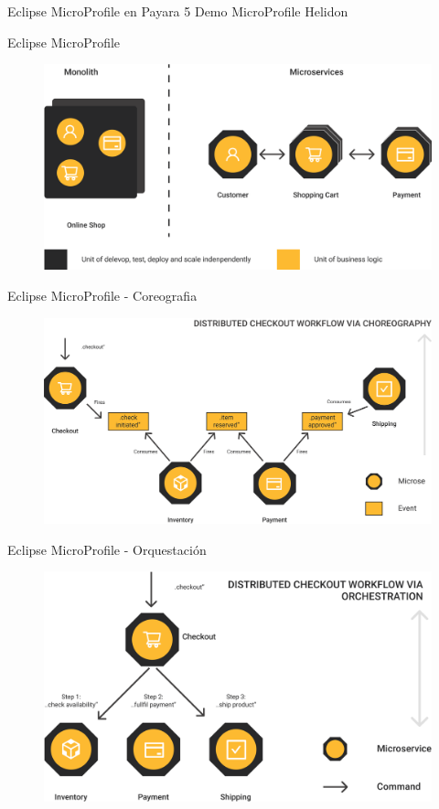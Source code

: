 \documentclass[aspectratio=169]{beamer}
\begin{document}
\begin{frame}[fragile]{Eclipse MicroProfile en Payara 5}
\LARGE Demo MicroProfile Helidon
\end{frame}

\begin{frame}{Eclipse MicroProfile}
\begin{figure}
	\centering
	\includegraphics[width=0.8\linewidth]{Images/mp0}
\end{figure}
\end{frame}

\begin{frame}{Eclipse MicroProfile - Coreografia}
\begin{figure}
	\centering
	\includegraphics[width=0.8\linewidth]{Images/mpcore}
\end{figure}
\end{frame}

\begin{frame}{Eclipse MicroProfile - Orquestación}
\begin{figure}
	\centering
	\includegraphics[width=0.8\linewidth]{Images/mporch}
\end{figure}
\end{frame}
\end{document}
